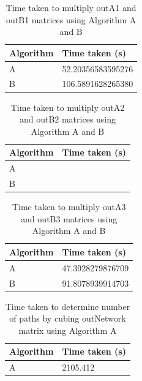 \documentclass[10pt,twocolumn]{witseiepaper}
\begin{document}
\begin{table}[h]
		\centering
		\caption{Time taken to multiply outA1 and outB1 matrices using Algorithm A and B}
\begin{tabular}{|l|l|}
	\hline 
	\textbf{Algorithm} & \textbf{Time taken (s)} \\ 
	\hline 
	 A & 52.20356583595276 \\ 
	\hline 
	 B & 106.5891628265380 \\ 
	\hline 
\end{tabular} 
\end{table}

\begin{table}[h]
	\centering
	\caption{Time taken to multiply outA2 and outB2 matrices using Algorithm A and B}
	\begin{tabular}{|l|l|}
		\hline 
		\textbf{Algorithm} & \textbf{Time taken (s)} \\ 
		\hline 
		A &  \\ 
		\hline 
		B &  \\ 
		\hline 
	\end{tabular} 
\end{table}

\begin{table}[h]
	\centering
	\caption{Time taken to multiply outA3 and outB3 matrices using Algorithm A and B}
	\begin{tabular}{|l|l|}
		\hline 
		\textbf{Algorithm} & \textbf{Time taken (s)} \\ 
		\hline 
		A & 47.3928279876709 \\ 
		\hline 
		B & 91.8078939914703 \\ 
		\hline 
	\end{tabular} 
\end{table}

\begin{table}[h]
	\centering
	\caption{Time taken to determine number of paths by cubing outNetwork matrix using Algorithm A}
	\begin{tabular}{|l|l|}
		\hline 
		\textbf{Algorithm} & \textbf{Time taken (s)} \\ 
		\hline 
		A & 2105.412 \\ 
		\hline 
	\end{tabular} 
\end{table}




\end{document}
